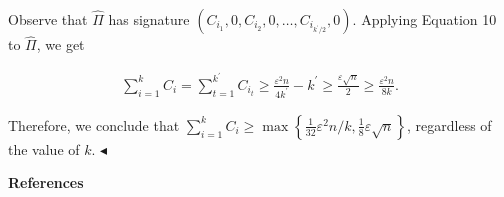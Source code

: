 \documentclass[10pt,a4paper]{article}
\begin{document}
\begin{itemize}
\begin{itemize}
Observe that $\widehat{\Pi}$ has signature $(C_{i_{1}},0,C_{i_{2}},0,\dots,C_{i_{k^{\prime}/2}},0)$.
Applying Equation 10 to $\widehat{\Pi}$,
we get\par


\[\begin{gathered}
\sum_{i=1}^{k}C_{i}=\sum_{t=1}^{k^{\prime}}C_{i_{t}}\geq\frac{\varepsilon^{2}n}{4k^{\prime}}-k^{\prime}\geq\frac{\varepsilon\sqrt{n}}{2}\geq\frac{\varepsilon^{2}n}{8k}.
\end{gathered}\]





\end{itemize}





\end{itemize}


Therefore, we conclude that
$\sum_{i=1}^{k}C_{i}\geq\max\left\{\frac{1}{32}\varepsilon^{2}n/k,\frac{1}{8}\varepsilon\sqrt{n}\right\}$, regardless of the value of $k$.
$\blacktriangleleft$\par







\par\medskip\noindent\textbf{References}\par
\end{document}
